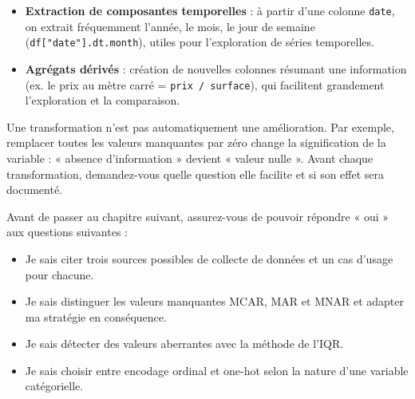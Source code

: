 \documentclass[
  french,
  letterpaper,
  open=any]{scrbook}
\providecommand{\tightlist}{%
  \setlength{\itemsep}{0pt}\setlength{\parskip}{0pt}}
\theoremstyle{definition}
\theoremstyle{definition}
\theoremstyle{remark}
\begin{document}
\begin{itemize}
\tightlist
\item
  \textbf{Extraction de composantes temporelles} : à partir d'une
  colonne \texttt{date}, on extrait fréquemment l'année, le mois, le
  jour de semaine (\texttt{df{[}"date"{]}.dt.month}), utiles pour
  l'exploration de séries temporelles.
\item
  \textbf{Agrégats dérivés} : création de nouvelles colonnes résumant
  une information (ex. le prix au mètre carré =
  \texttt{prix\ /\ surface}), qui facilitent grandement l'exploration et
  la comparaison.
\end{itemize}

\begin{tcolorbox}[enhanced jigsaw, arc=.35mm, bottomrule=.15mm, bottomtitle=1mm, breakable, colback=white, colbacktitle=quarto-callout-warning-color!10!white, colframe=quarto-callout-warning-color-frame, coltitle=black, left=2mm, leftrule=.75mm, opacityback=0, opacitybacktitle=0.6, rightrule=.15mm, title=\textcolor{quarto-callout-warning-color}{\faExclamationTriangle}\hspace{0.5em}{Ne pas transformer sans objectif}, titlerule=0mm, toprule=.15mm, toptitle=1mm]

Une transformation n'est pas automatiquement une amélioration. Par
exemple, remplacer toutes les valeurs manquantes par zéro change la
signification de la variable : « absence d'information » devient «
valeur nulle ». Avant chaque transformation, demandez-vous quelle
question elle facilite et si son effet sera documenté.

\end{tcolorbox}

\begin{tcolorbox}[enhanced jigsaw, arc=.35mm, bottomrule=.15mm, bottomtitle=1mm, breakable, colback=white, colbacktitle=quarto-callout-note-color!10!white, colframe=quarto-callout-note-color-frame, coltitle=black, left=2mm, leftrule=.75mm, opacityback=0, opacitybacktitle=0.6, rightrule=.15mm, title=\textcolor{quarto-callout-note-color}{\faInfo}\hspace{0.5em}{Auto-évaluation}, titlerule=0mm, toprule=.15mm, toptitle=1mm]

Avant de passer au chapitre suivant, assurez-vous de pouvoir répondre «
oui » aux questions suivantes :

\begin{itemize}
\tightlist
\item[$\square$]
  Je sais citer trois sources possibles de collecte de données et un cas
  d'usage pour chacune.
\item[$\square$]
  Je sais distinguer les valeurs manquantes MCAR, MAR et MNAR et adapter
  ma stratégie en conséquence.
\item[$\square$]
  Je sais détecter des valeurs aberrantes avec la méthode de l'IQR.
\item[$\square$]
  Je sais choisir entre encodage ordinal et one-hot selon la nature
  d'une variable catégorielle.
\end{itemize}

\end{tcolorbox}
\end{document}
